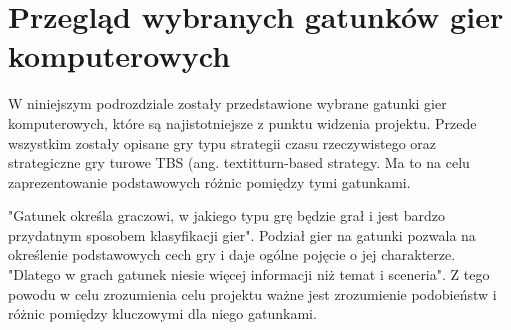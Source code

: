 \section{Przegląd wybranych gatunków gier komputerowych}
W niniejszym podrozdziale zostały przedstawione wybrane gatunki gier komputerowych, które są najistotniejsze z punktu widzenia
projektu. Przede wszystkim zostały opisane gry typu strategii czasu rzeczywistego oraz strategiczne gry turowe TBS (ang.
textit{turn-based strategy}. Ma to na celu zaprezentowanie podstawowych różnic pomiędzy tymi gatunkami.

"Gatunek określa graczowi, w jakiego typu grę będzie grał i jest bardzo przydatnym sposobem klasyfikacji gier"\cite{practical_game_design}.
Podział gier na gatunki pozwala na określenie podstawowych cech gry i daje ogólne pojęcie o jej charakterze. "Dlatego w
grach gatunek niesie więcej informacji niż temat i sceneria"\cite{practical_game_design}. Z tego powodu w celu
zrozumienia celu projektu ważne jest zrozumienie podobieństw i różnic pomiędzy kluczowymi dla niego gatunkami.





